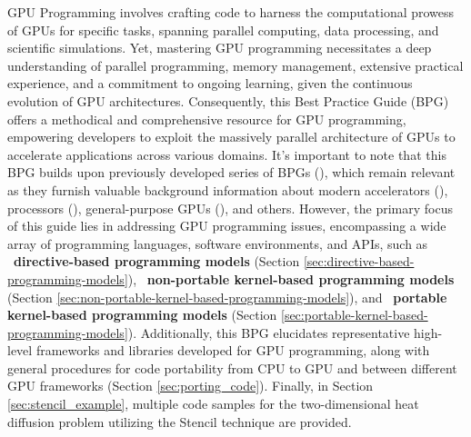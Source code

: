 GPU Programming involves crafting code to harness the computational prowess of GPUs for specific tasks, spanning parallel computing, data processing, and scientific simulations. Yet, mastering GPU programming necessitates a deep understanding of parallel programming, memory management, extensive practical experience, and a commitment to ongoing learning, given the continuous evolution of GPU architectures. Consequently, this Best Practice Guide (BPG) offers a methodical and comprehensive resource for GPU programming, empowering developers to exploit the massively parallel architecture of GPUs to accelerate applications across various domains. It's important to note that this BPG builds upon previously developed series of BPGs (\cite{prace-bpg}), which remain relevant as they furnish valuable background information about modern accelerators (\cite{modern-accelerators}), processors (\cite{modern-processors}), general-purpose GPUs (\cite{gpgpu}), and others. However, the primary focus of this guide lies in addressing GPU programming issues, encompassing a wide array of programming languages, software environments, and APIs, such as ~\textbf{directive-based programming models} (Section \ref{sec:directive-based-programming-models}), ~\textbf{non-portable kernel-based programming models} (Section \ref{sec:non-portable-kernel-based-programming-models}), and ~\textbf{portable kernel-based programming models} (Section \ref{sec:portable-kernel-based-programming-models}). Additionally, this BPG elucidates representative high-level frameworks and libraries developed for GPU programming, along with general procedures for code portability from CPU to GPU and between different GPU frameworks (Section \ref{sec:porting_code}). Finally, in Section \ref{sec:stencil_example}, multiple code samples for the two-dimensional heat diffusion problem utilizing the Stencil technique are provided.